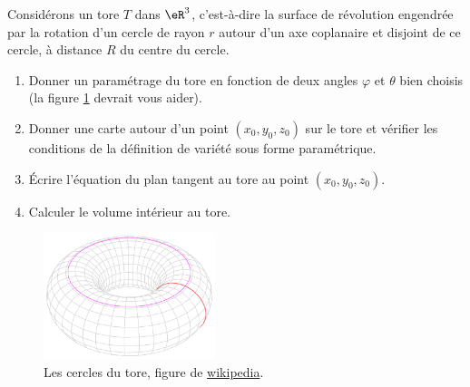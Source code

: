 
\begin{exercice}\label{exoTP20090003}


Considérons un tore $T$ dans $\eR^3$, c’est-à-dire la surface de révolution engendrée par la rotation d’un cercle de rayon $r$ autour d’un axe coplanaire et disjoint de ce cercle, à distance $R$ du centre du cercle.
\begin{enumerate}

	\item
		Donner un paramétrage du tore en fonction de deux angles $\varphi$ et $\theta$ bien choisis (la figure \ref{FigToreWiki} devrait vous aider).
	\item
		Donner une carte autour d’un point $(x_0 , y_0 , z_0 )$ sur le tore et vérifier les conditions de la définition de variété sous forme paramétrique.
	\item
		Écrire l'équation du plan tangent au tore au point $(x_0 , y_0 , z_0 )$.
	\item
		Calculer le volume intérieur au tore.

\end{enumerate}

\begin{figure}
	\includegraphics[width=5cm]{pictures_bitmap/Torus_cycles.png}
	\caption{Les cercles du tore, figure de \href{http://fr.wikipedia.org/wiki/Tore}{wikipedia}.}\label{FigToreWiki}
\end{figure}

\end{exercice}
